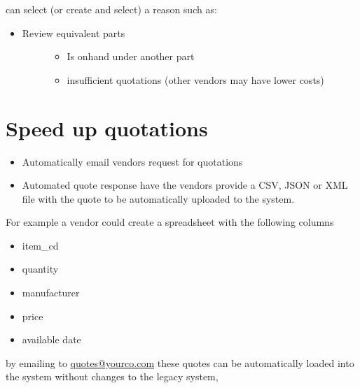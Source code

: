 \documentclass[letterpaper,10pt,english]{sphinxmanual}
\begin{document}
can select (or create and select) a reason such as:
\begin{itemize}
\item {} \begin{description}
\item[{Review equivalent parts}] \leavevmode\begin{itemize}
\item {} 
Is onhand under another part

\item {} 
insufficient quotations (other vendors may have lower costs)

\end{itemize}

\end{description}

\end{itemize}


\section{Speed up quotations}
\label{FutureState:speed-up-quotations}\begin{itemize}
\item {} 
Automatically email vendors request for quotations

\item {} 
Automated quote response have the vendors provide a CSV, JSON or XML
file with the quote to be automatically uploaded to the system.

\end{itemize}

For example a vendor could create a spreadsheet with the following
columns
\begin{itemize}
\item {} 
item\_cd

\item {} 
quantity

\item {} 
manufacturer

\item {} 
price

\item {} 
available date

\end{itemize}

by emailing to \href{mailto:quotes@yourco.com}{quotes@yourco.com} these quotes can be automatically
loaded into the system without changes to the legacy system,
\end{document}
